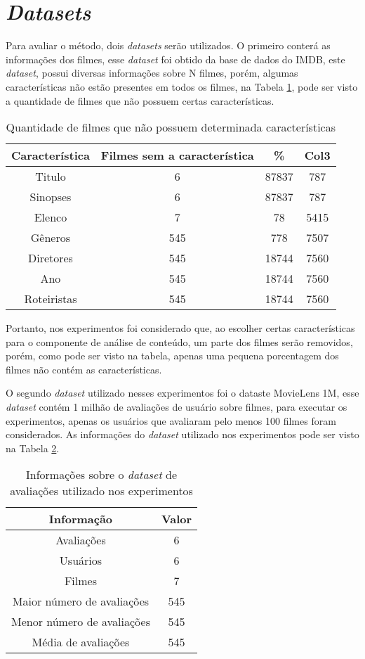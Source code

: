 \section{\textit{Datasets}}
Para avaliar o método, dois \textit{datasets} serão utilizados. O primeiro conterá as informações dos filmes, esse \textit{dataset} foi obtido da base de dados do IMDB, este \textit{dataset}, possui diversas informações sobre N filmes, porém, algumas características não estão presentes em todos os filmes, na Tabela \ref{tab:missing_values}, pode ser visto a quantidade de filmes que não possuem certas características.
\begin{table}[h]
\label{tab:missing_values}
 \centering
\begin{tabular}{|c| c c c|}
\hline
Característica &  Filmes sem a característica & \% & Col3 \\ 
\hline
Titulo & 6 & 87837 & 787 \\ 
\hline
Sinopses & 6 & 87837 & 787 \\ 
\hline
Elenco & 7 & 78 & 5415 \\
\hline
Gêneros & 545 & 778 & 7507 \\
\hline
Diretores & 545 & 18744 & 7560 \\
\hline
Ano & 545 & 18744 & 7560 \\
\hline    
Roteiristas & 545 & 18744 & 7560 \\
\hline
\end{tabular}
\caption{\label{tab:missing_values}Quantidade de filmes que não possuem determinada características}
\end{table}

Portanto, nos experimentos foi considerado que, ao escolher certas características para o componente de análise de conteúdo, um parte dos filmes serão removidos, porém, como pode ser visto na tabela, apenas uma pequena porcentagem dos filmes não contém as características.

O segundo \textit{dataset} utilizado nesses experimentos foi o dataste MovieLens 1M, esse \textit{dataset} contém 1 milhão de avaliações de usuário sobre filmes, para executar os experimentos, apenas os usuários que avaliaram pelo menos 100 filmes foram considerados. As informações do \textit{dataset} utilizado nos experimentos pode ser visto na Tabela \ref{tab:movielens}.

\begin{table}[h]
\label{tab:movielens}
 \centering
\begin{tabular}{|c| c |}
\hline
Informação &  Valor \\ 
\hline
Avaliações & 6  \\ 
\hline
Usuários & 6 \\ 
\hline
Filmes & 7 \\
\hline
Maior número de avaliações & 545  \\
\hline
Menor número de avaliações & 545 \\
\hline
Média de avaliações & 545  \\
\hline    
\end{tabular}
\caption{\label{tab:movielens}Informações sobre o \textit{dataset} de avaliações utilizado nos experimentos}
\end{table}

